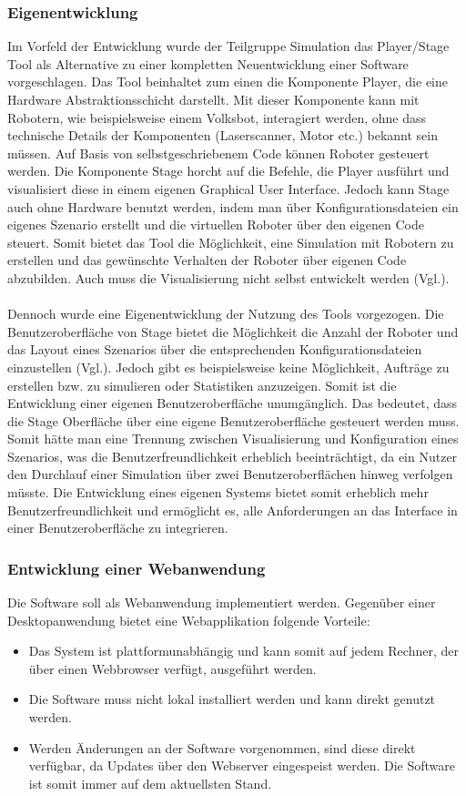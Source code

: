 \subsubsection{Eigenentwicklung}
Im Vorfeld der Entwicklung wurde der Teilgruppe Simulation das Player/Stage Tool als Alternative zu einer kompletten Neuentwicklung einer Software vorgeschlagen. Das Tool beinhaltet zum einen die Komponente Player, die eine Hardware Abstraktionsschicht darstellt. Mit dieser Komponente kann mit Robotern, wie beispielsweise einem Volksbot, interagiert werden, ohne dass technische Details der Komponenten (Laserscanner, Motor etc.) bekannt sein müssen. Auf Basis von selbstgeschriebenem Code können Roboter gesteuert werden. Die Komponente Stage horcht auf die Befehle, die Player ausführt und visualisiert diese in einem eigenen Graphical User Interface. Jedoch kann Stage auch ohne Hardware benutzt werden, indem man über Konfigurationsdateien ein eigenes Szenario erstellt und die virtuellen Roboter über den eigenen Code steuert. Somit bietet das Tool die Möglichkeit, eine Simulation mit Robotern zu erstellen und das gewünschte Verhalten der Roboter über eigenen Code abzubilden. Auch muss die Visualisierung nicht selbst entwickelt werden (Vgl.\cite{plstg}). 
\\\\
Dennoch wurde eine Eigenentwicklung der Nutzung des Tools vorgezogen. Die Benutzeroberfläche von Stage bietet die Möglichkeit die Anzahl der Roboter und das Layout eines Szenarios über die entsprechenden Konfigurationsdateien einzustellen (Vgl.\cite{plstg}). Jedoch gibt es beispielsweise keine Möglichkeit, Aufträge zu erstellen bzw. zu simulieren oder Statistiken anzuzeigen. Somit ist die Entwicklung einer eigenen Benutzeroberfläche unumgänglich. Das bedeutet, dass die Stage Oberfläche über eine eigene Benutzeroberfläche gesteuert werden muss. Somit hätte man eine Trennung zwischen Visualisierung und Konfiguration eines Szenarios, was die Benutzerfreundlichkeit erheblich beeinträchtigt, da ein Nutzer den Durchlauf einer Simulation über zwei Benutzeroberflächen hinweg verfolgen müsste. Die Entwicklung eines eigenen Systems bietet somit erheblich mehr Benutzerfreundlichkeit und ermöglicht es, alle Anforderungen an das Interface in einer Benutzeroberfläche zu integrieren.
\subsubsection{Entwicklung einer Webanwendung}\label{sec:Entwicklung einer Webanwendung} 
Die Software soll als Webanwendung implementiert werden. Gegenüber einer Desktopanwendung bietet eine Webapplikation folgende Vorteile:
\begin{itemize}
\item Das System ist plattformunabhängig und kann somit auf jedem Rechner, der über einen Webbrowser verfügt, ausgeführt werden.
\item Die Software muss nicht lokal installiert werden und kann direkt genutzt werden.
\item Werden Änderungen an der Software vorgenommen, sind diese direkt verfügbar, da Updates über den Webserver eingespeist werden. Die Software ist somit immer auf dem aktuellsten Stand. 
\end{itemize}
